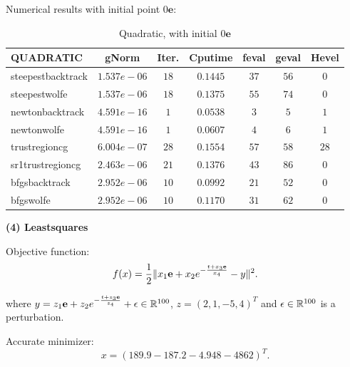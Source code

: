 \documentclass[11pt]{report}
\begin{document}
Numerical results with initial point $0\mathbf{e}$:
\begin{table}[H]
    \caption{Quadratic, with initial $0\mathbf{e}$}
    \label{tab:Quadratic_initial}
    \begin{center}
        \begin{tabular}{l|cccccc}
\textbf{QUADRATIC}& gNorm       &   Iter.  &   Cputime   &   feval&geval&Hevel\\
\hline
steepestbacktrack   &   $1.537e-06 $&   $18   $&   $0.1445  $&$37   $&$56   $&$0    $       \\
steepestwolfe       &   $1.537e-06 $&   $18   $&   $0.1375  $&$55   $&$74   $&$0    $       \\
newtonbacktrack     &   $4.591e-16 $&   $1    $&   $0.0538  $&$3    $&$5    $&$1    $       \\
newtonwolfe         &   $4.591e-16 $&   $1    $&   $0.0607  $&$4    $&$6    $&$1    $       \\
trustregioncg       &   $6.004e-07 $&   $28   $&   $0.1554  $&$57   $&$58   $&$28   $       \\
sr1trustregioncg    &   $2.463e-06 $&   $21   $&   $0.1376  $&$43   $&$86   $&$0    $       \\
bfgsbacktrack       &   $2.952e-06 $&   $10   $&   $0.0992  $&$21   $&$52   $&$0    $       \\
bfgswolfe           &   $2.952e-06 $&   $10   $&   $0.1170  $&$31   $&$62   $&$0    $       \\
 \end{tabular}
    \end{center}
\end{table}

\textbf{(4) Leastsquares }

Objective function: 
\begin{equation}
    f(x) = \frac{1}{2}\|x_1\mathbf{e}+x_2e^{-\frac{t+x_3\mathbf{e}}{x_4}}-y\|^2.
\end{equation}

where $y=z_1\mathbf{e}+z_2e^{-\frac{t+z_3\mathbf{e}}{z_4}} + \epsilon\in \mathbb{R}^{100}$, $z=(2,1,-5,4)^T$ and $\epsilon\in \mathbb{R}^{100}$ is a perturbation.

Accurate minimizer:
\begin{equation}
   x = (189.9  -187.2  -4.948  -4862)^T.
\end{equation}
\end{document}
